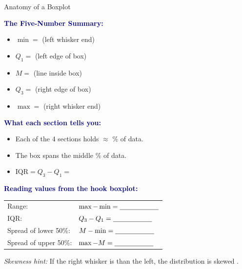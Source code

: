 \documentclass[10pt]{article}
\begin{document}
\vspace{0.08in}

\begin{notesbox}{Anatomy of a Boxplot}
\small
\begin{multicols}{2}

\textbf{\textcolor{navy}{The Five-Number Summary:}}
\begin{itemize}[itemsep=3pt]
  \item $\min = $ \blank{2cm} (left whisker end)
  \item $Q_1 = $ \blank{2cm} (left edge of box)
  \item $M = $ \blank{2cm} (line inside box)
  \item $Q_3 = $ \blank{2cm} (right edge of box)
  \item $\max = $ \blank{2cm} (right whisker end)
\end{itemize}

\vspace{6pt}
\textbf{\textcolor{navy}{What each section tells you:}}
\begin{itemize}[itemsep=3pt]
  \item Each of the 4 sections holds $\approx$ \blank{1.2cm}\% of data.
  \item The box spans the middle \blank{1.2cm}\% of data.
  \item $\text{IQR} = Q_3 - Q_1 = $ \blank{2cm}
\end{itemize}

\columnbreak

\textbf{\textcolor{navy}{Reading values from the hook boxplot:}}

\vspace{4pt}
\renewcommand{\arraystretch}{1.5}
\begin{tabularx}{\columnwidth}{@{} l X @{}}
Range: & $\max - \min = \blank{2cm}$ \\
IQR:   & $Q_3 - Q_1 = \blank{2cm}$ \\
Spread of lower 50\%: & $M - \min = \blank{2cm}$ \\
Spread of upper 50\%: & $\max - M = \blank{2cm}$ \\
\end{tabularx}

\vspace{6pt}
\textit{Skewness hint:} If the right whisker is \blank{2.5cm} than the left,
the distribution is skewed \blank{2cm}.

\end{multicols}
\end{notesbox}
\end{document}
